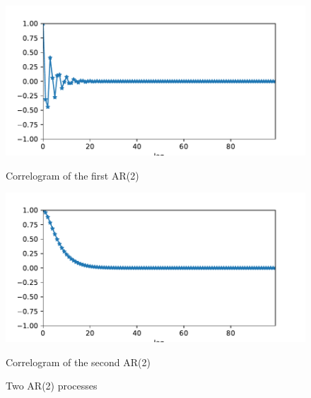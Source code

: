 \documentclass[11pt]{article}
\begin{document}
\begin{exercise}[subtitle=AR(2) process]
\begin{figure}
    \centering
    \begin{minipage}[t]{0.45\textwidth}
    \centerline{\includegraphics[width=\textwidth]{images/acf1.pdf}}
    \centerline{Correlogram of the first AR(2)}
    \end{minipage}
    \hfill
    \begin{minipage}[t]{0.45\textwidth}    \centerline{\includegraphics[width=\textwidth]{images/acf2.pdf}}
    \centerline{Correlogram of the second AR(2)}
    \end{minipage}
    \caption{Two AR(2) processes}\label{fig:q-ar-2-corr}
\end{figure}



\end{exercise}
\end{document}

